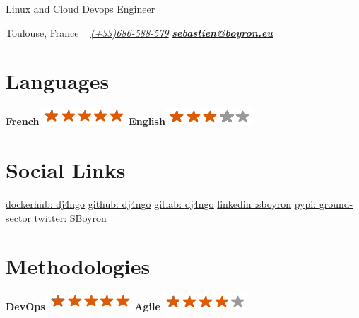 \documentclass[]{friggeri-cv}
\begin{document}
    {Linux and Cloud Devops Engineer}


\begin{aside}
        Toulouse, France
        ~
	\href{tel:+33686588579}{\textit{(+33)686-588-579}}
	\href{mailto:sebastien@boyron.eu}{\textit{\textbf{sebastien@boyron.eu}}}
    \section{Languages}
        \textbf{French}\includegraphics[scale=0.40]{img/5stars.png}
        \textbf{English}\includegraphics[scale=0.40]{img/3stars.png}
        ~
    \section{Social Links}
        \href{https://hub.docker.com/u/dj4ngo/}{dockerhub: \underline{dj4ngo}}
	\href{https://github.com/dj4ngo}{github: \underline{dj4ngo}}
        \href{https://gitlab.com/dj4ngo}{gitlab: \underline{dj4ngo}}
	\href{https://www.linkedin.com/in/sboyron/}{linkedin :\underline{sboyron}}
	\href{https://pypi.org/user/ground-sector/}{pypi: \underline{ground-sector}}
        \href{https://twitter.com/SBoyron}{twitter: \underline{SBoyron}}
        ~
    \section{Methodologies}
        \textbf{DevOps}\includegraphics[scale=0.40]{img/5stars.png}
        \textbf{Agile}\includegraphics[scale=0.40]{img/4stars.png}
        ~

\end{aside}
\end{document}
